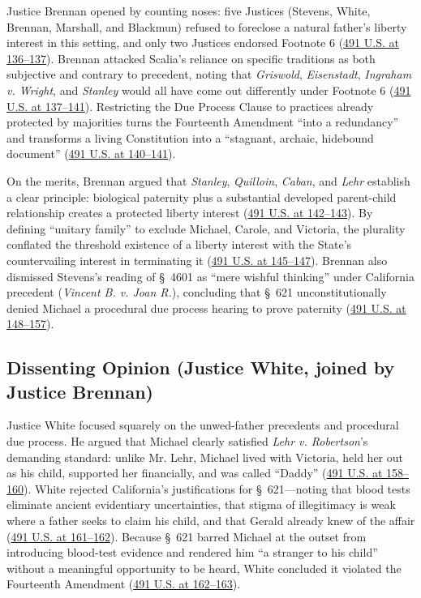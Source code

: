 \documentclass[12pt]{article}
\begin{document}
Justice Brennan opened by counting noses: five Justices (Stevens, White, Brennan, Marshall, and Blackmun) refused to foreclose a natural father's liberty interest in this setting, and only two Justices endorsed Footnote 6 (\href{https://supreme.justia.com/cases/federal/us/491/110/}{491 U.S. at 136--137}). Brennan attacked Scalia's reliance on specific traditions as both subjective and contrary to precedent, noting that \textit{Griswold}, \textit{Eisenstadt}, \textit{Ingraham v. Wright}, and \textit{Stanley} would all have come out differently under Footnote 6 (\href{https://supreme.justia.com/cases/federal/us/491/110/}{491 U.S. at 137--141}). Restricting the Due Process Clause to practices already protected by majorities turns the Fourteenth Amendment ``into a redundancy'' and transforms a living Constitution into a ``stagnant, archaic, hidebound document'' (\href{https://supreme.justia.com/cases/federal/us/491/110/}{491 U.S. at 140--141}).

On the merits, Brennan argued that \textit{Stanley}, \textit{Quilloin}, \textit{Caban}, and \textit{Lehr} establish a clear principle: biological paternity plus a substantial developed parent-child relationship creates a protected liberty interest (\href{https://supreme.justia.com/cases/federal/us/491/110/}{491 U.S. at 142--143}). By defining ``unitary family'' to exclude Michael, Carole, and Victoria, the plurality conflated the threshold existence of a liberty interest with the State's countervailing interest in terminating it (\href{https://supreme.justia.com/cases/federal/us/491/110/}{491 U.S. at 145--147}). Brennan also dismissed Stevens's reading of \S~4601 as ``mere wishful thinking'' under California precedent (\textit{Vincent B. v. Joan R.}), concluding that \S~621 unconstitutionally denied Michael a procedural due process hearing to prove paternity (\href{https://supreme.justia.com/cases/federal/us/491/110/}{491 U.S. at 148--157}).

\subsection{Dissenting Opinion (Justice White, joined by Justice Brennan)}

Justice White focused squarely on the unwed-father precedents and procedural due process. He argued that Michael clearly satisfied \textit{Lehr v. Robertson}'s demanding standard: unlike Mr. Lehr, Michael lived with Victoria, held her out as his child, supported her financially, and was called ``Daddy'' (\href{https://supreme.justia.com/cases/federal/us/491/110/}{491 U.S. at 158--160}). White rejected California's justifications for \S~621---noting that blood tests eliminate ancient evidentiary uncertainties, that stigma of illegitimacy is weak where a father seeks to claim his child, and that Gerald already knew of the affair (\href{https://supreme.justia.com/cases/federal/us/491/110/}{491 U.S. at 161--162}). Because \S~621 barred Michael at the outset from introducing blood-test evidence and rendered him ``a stranger to his child'' without a meaningful opportunity to be heard, White concluded it violated the Fourteenth Amendment (\href{https://supreme.justia.com/cases/federal/us/491/110/}{491 U.S. at 162--163}).
\end{document}
